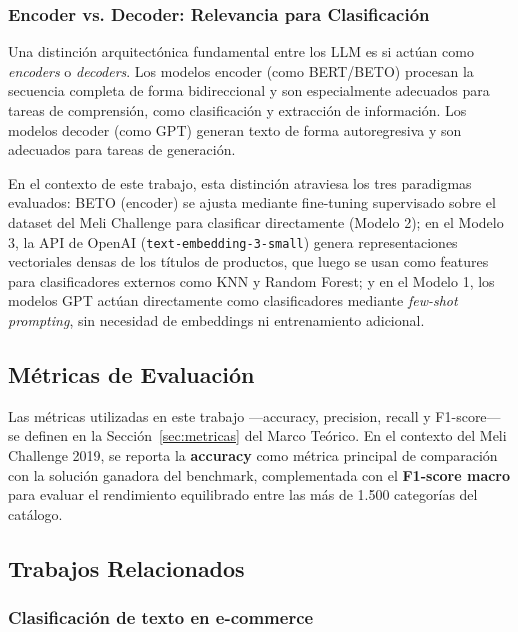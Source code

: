 \documentclass[11pt,a4paper]{article}
\begin{document}
\subsubsection{Encoder vs. Decoder: Relevancia para Clasificación}

Una distinción arquitectónica fundamental entre los LLM es si actúan como \emph{encoders} o \emph{decoders}. Los modelos encoder (como BERT/BETO) procesan la secuencia completa de forma bidireccional y son especialmente adecuados para tareas de comprensión, como clasificación y extracción de información. Los modelos decoder (como GPT) generan texto de forma autoregresiva y son adecuados para tareas de generación.

En el contexto de este trabajo, esta distinción atraviesa los tres paradigmas evaluados: BETO (encoder) se ajusta mediante fine-tuning supervisado sobre el dataset del Meli Challenge para clasificar directamente (Modelo 2); en el Modelo 3, la API de OpenAI (\texttt{text-embedding-3-small}) genera representaciones vectoriales densas de los títulos de productos, que luego se usan como features para clasificadores externos como KNN y Random Forest; y en el Modelo 1, los modelos GPT actúan directamente como clasificadores mediante \emph{few-shot prompting}, sin necesidad de embeddings ni entrenamiento adicional.

\subsection{Métricas de Evaluación}

Las métricas utilizadas en este trabajo ---accuracy, precision, recall y F1-score--- se definen en la Sección~\ref{sec:metricas} del Marco Teórico. En el contexto del Meli Challenge 2019, se reporta la \textbf{accuracy} como métrica principal de comparación con la solución ganadora del benchmark, complementada con el \textbf{F1-score macro} para evaluar el rendimiento equilibrado entre las más de 1.500 categorías del catálogo.

\subsection{Trabajos Relacionados}

\subsubsection{Clasificación de texto en e-commerce}
\end{document}
